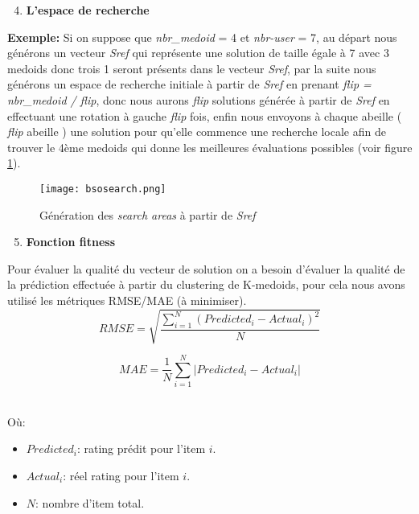 \begin{enumerate}[nosep,label=\textbf{\arabic*)}]
	\setcounter{enumi}{3}
	\item \textbf{L'espace de recherche}
\end{enumerate}\mbox{}\indent
\textbf{Exemple:}
Si on suppose que \textit{nbr{\_}medoid} = 4 et \textit{nbr-user} = 7, au départ nous générons un vecteur \textit{Sref} qui représente une solution de taille égale à 7 avec 3 medoids donc trois 1 seront présents dans le vecteur \textit{Sref}, par la suite nous générons un espace de recherche initiale à partir de \textit{Sref}  en prenant \textit{flip = nbr{\_}medoid / flip}, donc nous aurons \textit{flip} solutions générée à partir de \textit{Sref} en effectuant une rotation à gauche \textit{flip} fois, enfin nous envoyons à chaque abeille ( \textit{flip} abeille ) une solution pour qu'elle commence une recherche locale afin de trouver le 4ème medoids qui donne les meilleures évaluations possibles (voir figure \ref{fig:bsosearch}).

 \begin{figure}[H]
	\centering
	\texttt{[image: bsosearch.png]}
	\caption{Génération des \textit{search areas} à partir de \textit{Sref}}
	\label{fig:bsosearch}
\end{figure}

\begin{enumerate}[nosep,label=\textbf{\arabic*)}]
	\setcounter{enumi}{4}
	\item \textbf{Fonction fitness}
\end{enumerate}\mbox{}\indent Pour évaluer la qualité du vecteur de solution on a besoin d'évaluer la qualité de la prédiction effectuée à partir du clustering de K-medoids, pour cela nous avons utilisé les métriques RMSE/MAE (à minimiser).
\begin{equation}\label{eq:1}
RMSE = \sqrt{\frac{\sum_{i=1}^{N} (Predicted_{i} - Actual_{i})^{2}  } {N}}  
\end{equation}

\begin{equation}
MAE= \frac {1}{N} \sum_{i=1}^{N} | Predicted_{i} -  Actual_{i}|
\end{equation}

\mbox{}\\Où: 
\begin{itemize}
	\item $Predicted_{i}$: rating prédit pour l'item $i$.
	\item $Actual_{i}$: réel rating  pour l'item $i$.
	\item $N$: nombre d'item total.
\end{itemize}

